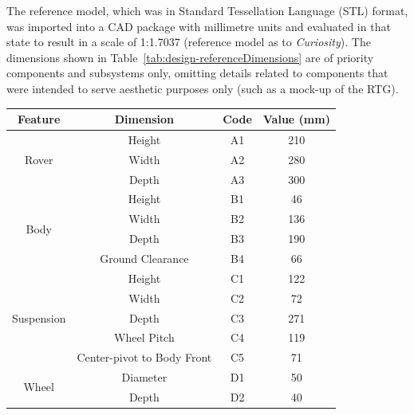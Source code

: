       The reference model, which was in Standard Tessellation Language (STL) format, was imported into a CAD package with millimetre units and evaluated in that state to result in a scale of 1:1.7037 (reference model as to \textit{Curiosity}). The dimensions shown in Table~\ref{tab:design-referenceDimensions} are of priority components and subsystems only, omitting details related to components that were intended to serve aesthetic purposes only (such as a mock-up of the RTG).
      
      \begin{table}[h!]
      \centering
      \begin{tabular}{@{}cccc@{}}
      \toprule
      \textbf{Feature}            & \textbf{Dimension}            & \textbf{Code} & \textbf{Value (mm)} \\ \midrule
      \multirow{3}{*}{Rover}      & Height                        & A1   & 210   \\
                                  & Width                         & A2   & 280   \\
                                  & Depth                         & A3   & 300   \\ \midrule
      \multirow{4}{*}{Body}       & Height                        & B1   & 46    \\
                                  & Width                         & B2   & 136   \\
                                  & Depth                         & B3   & 190   \\
                                  & Ground Clearance              & B4   & 66    \\ \midrule
      \multirow{5}{*}{Suspension} & Height                        & C1   & 122   \\
                                  & Width                         & C2   & 72    \\
                                  & Depth                         & C3   & 271   \\
                                  & Wheel Pitch                   & C4   & 119   \\
                                  & Center-pivot to Body Front    & C5   & 71    \\ \midrule
      \multirow{2}{*}{Wheel}      & Diameter                      & D1   & 50    \\
                                  & Depth                         & D2   & 40    \\ \midrule

\end{tabular}
\end{table}
